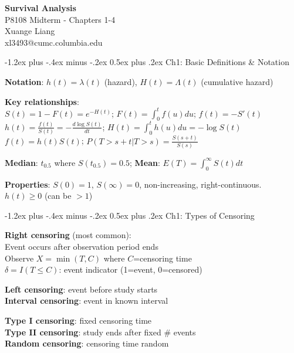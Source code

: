 ﻿\documentclass[10pt,letterpaper]{extarticle}
\makeatletter
\renewcommand{\section}{\@startsection{section}{1}{0mm}%
                                {-1.2ex plus -.4ex minus -.2ex}%
                                {0.5ex plus .2ex}%
                                {\normalfont\normalsize\bfseries}}
\newcommand{\h}[1]{\textbf{#1}}
\makeatother
\begin{document}
\raggedright
\footnotesize
\begin{multicols}{3}

\setlength{\columnsep}{4pt}
\setlength{\multicolsep}{4pt plus 1.5pt minus 1pt}

\begin{center}
     \Large{\textbf{Survival Analysis}} \\
     \normalsize{P8108 Midterm - Chapters 1-4} \\
     \small{Xuange Liang \\ xl3493@cumc.columbia.edu}
\end{center}

\section{Ch1: Basic Definitions \& Notation}

\h{Notation}: $h(t)=\lambda(t)$ (hazard), $H(t)=\Lambda(t)$ (cumulative hazard)

\h{Key relationships}: \\
$S(t) = 1-F(t) = e^{-H(t)}$; $F(t) = \int_0^t f(u)du$; $f(t) = -S'(t)$ \\
$h(t) = \frac{f(t)}{S(t)} = -\frac{d\log S(t)}{dt}$; $H(t) = \int_0^t h(u)du = -\log S(t)$ \\
$f(t) = h(t)S(t)$; $P(T>s+t|T>s) = \frac{S(s+t)}{S(s)}$

\h{Median}: $t_{0.5}$ where $S(t_{0.5})=0.5$; \h{Mean}: $E(T)=\int_0^\infty S(t)dt$

\h{Properties}: $S(0)=1$, $S(\infty)=0$, non-increasing, right-continuous. $h(t) \ge 0$ (can be $>1$)

\vspace{2pt}
\section{Ch1: Types of Censoring}

\h{Right censoring} (most common): \\
Event occurs after observation period ends \\
Observe $X = \min(T, C)$ where $C$=censoring time \\
$\delta = I(T \le C)$: event indicator (1=event, 0=censored)

\h{Left censoring}: event before study starts \\
\h{Interval censoring}: event in known interval

\h{Type I censoring}: fixed censoring time \\
\h{Type II censoring}: study ends after fixed \# events \\
\h{Random censoring}: censoring time random


\end{multicols}
\end{document}
